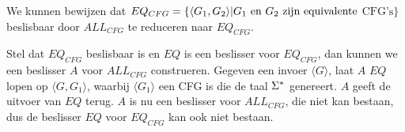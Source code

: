   We kunnen bewijzen dat $EQ_{CFG} = \{\langle G_1,G_2 \rangle | G_1 \text{ en } G_2 \text{ zijn equivalente}$ $\text{CFG's}\}$ beslisbaar door $ALL_{CFG}$ te reduceren naar $EQ_{CFG}$.

  Stel dat $EQ_{CFG}$ beslisbaar is en $EQ$ is een beslisser voor $EQ_{CFG}$, dan kunnen we een beslisser $A$ voor $ALL_{CFG}$ construeren. Gegeven een invoer $\langle G \rangle$, laat $A$ $EQ$ lopen op $\langle G,G_1 \rangle$, waarbij $\langle G_1 \rangle$ een CFG is die de taal $\Sigma^*$ genereert. $A$ geeft de uitvoer van $EQ$ terug. $A$ is nu een beslisser voor $ALL_{CFG}$, die niet kan bestaan, dus de beslisser $EQ$ voor $EQ_{CFG}$ kan ook niet bestaan.